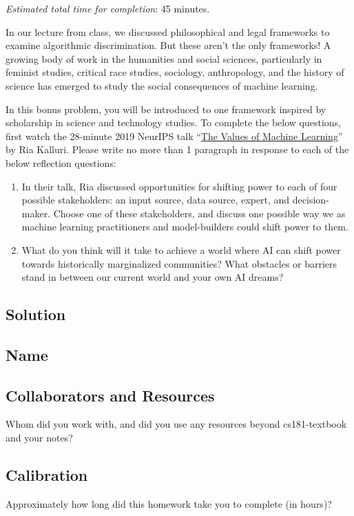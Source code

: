 \documentclass[submit]{harvardml}
\begin{document}

\begin{problem}
\emph{Estimated total time for completion}: 45 minutes.

In our lecture from class, we discussed philosophical and legal frameworks to examine algorithmic discrimination.  But these aren't the only frameworks!  A growing body of work in the humanities and social sciences, particularly in feminist studies, critical race studies, sociology, anthropology, and the history of science has emerged to study the social consequences of machine learning.

In this bonus problem, you will be introduced to one framework inspired by scholarship in science and technology studies.  To complete the below questions, first watch the 28-minute 2019 NeurIPS talk ``\href{https://slideslive.com/38923453/the-values-of-machine-learning}{The Values of Machine Learning}'' by Ria Kalluri.  Please write no more than 1 paragraph in response to each of the below reflection questions:

\begin{enumerate}
    \item In their talk, Ria discussed opportunities for shifting power to each of four possible stakeholders: an input source, data source, expert, and decision-maker.  Choose one of these stakeholders, and discuss one possible way we as machine learning practitioners and model-builders could shift power to them.
    \item What do you think will it take to achieve a world where AI can shift power towards historically marginalized communities?  What obstacles or barriers stand in between our current world and your own AI dreams?
\end{enumerate}

\end{problem}


\subsection*{Solution}

\newpage
\subsection*{Name}

\subsection*{Collaborators and Resources}
Whom did you work with, and did you use any resources beyond cs181-textbook and your notes?

\subsection*{Calibration}
Approximately how long did this homework take you to complete (in hours)? 
\end{document}
